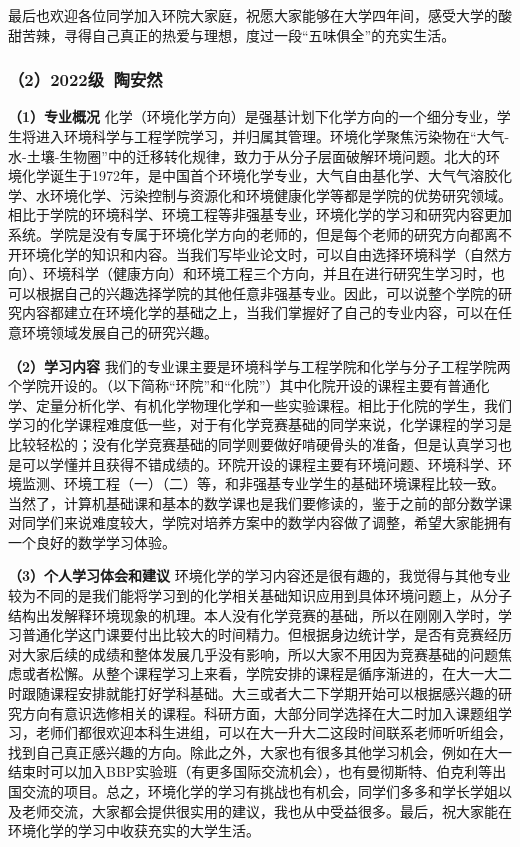 \documentclass[11pt,oneside]{book}
\begin{document}
最后也欢迎各位同学加入环院大家庭，祝愿大家能够在大学四年间，感受大学的酸甜苦辣，寻得自己真正的热爱与理想，度过一段“五味俱全”的充实生活。

\subsubsection{（2）2022级\ 陶安然}

\textbf{（1）专业概况}
化学（环境化学方向）是强基计划下化学方向的一个细分专业，学生将进入环境科学与工程学院学习，并归属其管理。环境化学聚焦污染物在“大气-水-土壤-生物圈”中的迁移转化规律，致力于从分子层面破解环境问题。北大的环境化学诞生于1972年，是中国首个环境化学专业，大气自由基化学、大气气溶胶化学、水环境化学、污染控制与资源化和环境健康化学等都是学院的优势研究领域。相比于学院的环境科学、环境工程等非强基专业，环境化学的学习和研究内容更加系统。学院是没有专属于环境化学方向的老师的，但是每个老师的研究方向都离不开环境化学的知识和内容。当我们写毕业论文时，可以自由选择环境科学（自然方向）、环境科学（健康方向）和环境工程三个方向，并且在进行研究生学习时，也可以根据自己的兴趣选择学院的其他任意非强基专业。因此，可以说整个学院的研究内容都建立在环境化学的基础之上，当我们掌握好了自己的专业内容，可以在任意环境领域发展自己的研究兴趣。

\textbf{（2）学习内容}
我们的专业课主要是环境科学与工程学院和化学与分子工程学院两个学院开设的。（以下简称“环院”和“化院”）其中化院开设的课程主要有普通化学、定量分析化学、有机化学物理化学和一些实验课程。相比于化院的学生，我们学习的化学课程难度低一些，对于有化学竞赛基础的同学来说，化学课程的学习是比较轻松的；没有化学竞赛基础的同学则要做好啃硬骨头的准备，但是认真学习也是可以学懂并且获得不错成绩的。环院开设的课程主要有环境问题、环境科学、环境监测、环境工程（一）（二）等，和非强基专业学生的基础环境课程比较一致。当然了，计算机基础课和基本的数学课也是我们要修读的，鉴于之前的部分数学课对同学们来说难度较大，学院对培养方案中的数学内容做了调整，希望大家能拥有一个良好的数学学习体验。

\textbf{（3）个人学习体会和建议}
环境化学的学习内容还是很有趣的，我觉得与其他专业较为不同的是我们能将学习到的化学相关基础知识应用到具体环境问题上，从分子结构出发解释环境现象的机理。本人没有化学竞赛的基础，所以在刚刚入学时，学习普通化学这门课要付出比较大的时间精力。但根据身边统计学，是否有竞赛经历对大家后续的成绩和整体发展几乎没有影响，所以大家不用因为竞赛基础的问题焦虑或者松懈。从整个课程学习上来看，学院安排的课程是循序渐进的，在大一大二时跟随课程安排就能打好学科基础。大三或者大二下学期开始可以根据感兴趣的研究方向有意识选修相关的课程。科研方面，大部分同学选择在大二时加入课题组学习，老师们都很欢迎本科生进组，可以在大一升大二这段时间联系老师听听组会，找到自己真正感兴趣的方向。除此之外，大家也有很多其他学习机会，例如在大一结束时可以加入BBP实验班（有更多国际交流机会），也有曼彻斯特、伯克利等出国交流的项目。总之，环境化学的学习有挑战也有机会，同学们多多和学长学姐以及老师交流，大家都会提供很实用的建议，我也从中受益很多。最后，祝大家能在环境化学的学习中收获充实的大学生活。
\end{document}
